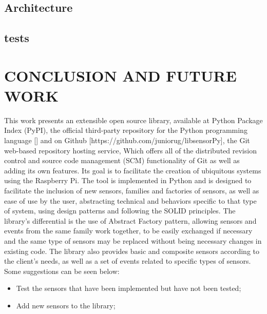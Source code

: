 \documentclass{acm_proc_article-sp}
\begin{document}
\subsection{Architecture}

\subsection{tests}

\section{CONCLUSION AND FUTURE WORK}
This work presents an extensible open source library, available at Python Package Index (PyPI), the official third-party repository for the Python programming language [] %
and on Github [https://github.com/juniorug/libsensorPy], the Git web-based repository hosting service, Which offers all of the distributed revision control and source code management (SCM) functionality of Git as well as adding its own features.
\newline
\newline
Its goal is to facilitate the creation of ubiquitous systems using the Raspberry Pi. The tool is implemented in Python and is designed to facilitate the inclusion of new sensors, families and factories of sensors, as well as ease of use by the user, abstracting technical and behaviors specific to that type of system, using design patterns and following the SOLID principles.
\newline
\newline
The library's differential is the use of Abstract Factory pattern, allowing sensors and events from the same family work together, to be easily exchanged if necessary and the same type of sensors may be replaced without being necessary changes in existing code. The library also provides basic and composite  sensors according to the client's needs, as well as a set of events related to specific types of sensors.
\newline
\newline
Some suggestions can be seen below:
\begin{itemize}
\item Test the sensors that have been implemented but have not been tested;
\item Add new sensors to the library;

\end{itemize}
\end{document}
